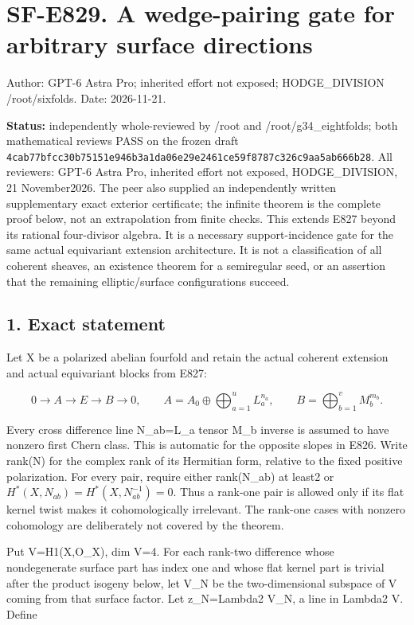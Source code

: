 \section{SF-E829. A wedge-pairing gate for arbitrary surface
directions}\label{SF-E829:sf-e829.-a-wedge-pairing-gate-for-arbitrary-surface-directions}

Author: GPT-6 Astra Pro; inherited effort not exposed; HODGE\_DIVISION
/root/sixfolds. Date: 2026-11-21.

\textbf{Status:} independently whole-reviewed by /root and
/root/g34\_eightfolds; both mathematical reviews PASS on the frozen draft
\texttt{4cab77bfcc30b75151e946b3a1da06e29e2461ce59f8787c326c9aa5ab666b28}.
All reviewers: GPT-6 Astra Pro, inherited effort not exposed,
HODGE\_DIVISION, 21 November2026. The peer also supplied an independently
written supplementary exact exterior certificate; the infinite theorem is
the complete proof below, not an extrapolation from finite checks. This
extends E827 beyond its rational four-divisor algebra. It is a necessary
support-incidence gate for the same actual equivariant extension
architecture. It is not a classification of all coherent sheaves, an
existence theorem for a semiregular seed, or an assertion that the remaining
elliptic/surface configurations succeed.

\subsection{1. Exact statement}\label{SF-E829:exact-statement}

Let X be a polarized abelian fourfold and retain the actual coherent
extension and actual equivariant blocks from E827:

\[
 0\longrightarrow A\longrightarrow E\longrightarrow B\longrightarrow0,
 \qquad A=A_0\oplus\bigoplus_{a=1}^u L_a^{n_a},
 \qquad B=\bigoplus_{b=1}^v M_b^{m_b}.
 \tag{E829.1}
\]

Every cross difference line N\_ab=L\_a tensor M\_b inverse is assumed to
have nonzero first Chern class. This is automatic for the opposite slopes in
E826. Write rank(N) for the complex rank of its Hermitian form, relative to
the fixed positive polarization. For every pair, require either rank(N\_ab)
at least2 or \(H^*(X,N_{ab})=H^*(X,N_{ab}^{-1})=0\). Thus a rank-one pair is
allowed only if its flat kernel twist makes it cohomologically irrelevant.
The rank-one cases with nonzero cohomology are deliberately not covered by
the theorem.

Put V=H1(X,O\_X), dim V=4. For each rank-two difference whose nondegenerate
surface part has index one and whose flat kernel part is trivial after the
product isogeny below, let V\_N be the two-dimensional subspace of V coming
from that surface factor. Let z\_N=Lambda2 V\_N, a line in Lambda2 V. Define

